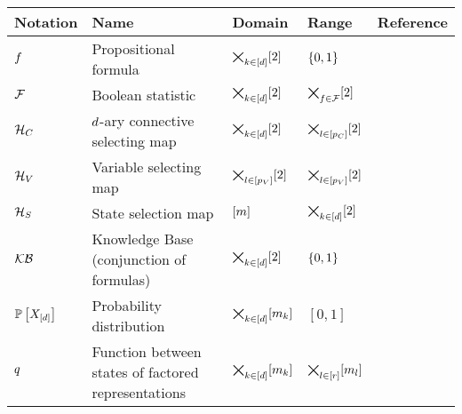 \begin{center}
    \begin{tabular}{|p{\fivecolumnwidth}|p{\threecolumnwidth}|p{\fivecolumnwidth}|p{\fivecolumnwidth}|p{\fivecolumnwidth}|}
        \hline
        \rule{0pt}{\rowheight} \textbf{Notation} & \textbf{Name}                                       & \textbf{Domain}                                             & \textbf{Range}                                              & \textbf{Reference}                   \\
        \hline
        \rule{0pt}{\rowheight} $f$      & Propositional formula                               & $\bigtimes_{k\in[d]}[2]$                                               & $\{0,1\}$                                                    & {def:formulas}                \\
        \rule{0pt}{\rowheight} $\mathcal{F}$        & Boolean statistic                                   & $\bigtimes_{k\in[d]}[2]$                                               & $\bigtimes_{f\in\mathcal{F}}[2]$                                                    & {def:mln}                \\
        \rule{0pt}{\rowheight} $\mathcal{H}_{C}$  & $d$-ary connective selecting map & $\bigtimes_{k\in[d]}[2]$                                               & $\bigtimes_{l\in[p_{C}]}[2]$ & {def:connectiveSelector} \\
        \rule{0pt}{\rowheight} $\mathcal{H}_{V}$  & Variable selecting map                              & $\bigtimes_{l\in[p_{V}]}[2]$ & $\bigtimes_{l\in[p_{V}]}[2]$ & {def:variableSelector} \\ %
        \rule{0pt}{\rowheight} $\mathcal{H}_{S}$  & State selection map                                 & $[m]$                                                 & $\bigtimes_{k\in[d]}[2]$ & {def:stateSelector} \\
        \rule{0pt}{\rowheight} $\mathcal{KB}$             & Knowledge Base (conjunction of formulas)            & $\bigtimes_{k\in[d]}[2]$                                               & $\{0,1\}$                                                    &                                      \\
        \rule{0pt}{\rowheight} $\mathbb{P}\left[X_{[d]}\right]$       & Probability distribution                            & $\bigtimes_{k\in[d]}[m_{k}]$                                                & $[0,1]$                                                     & {def:probabilityDistribution} \\
        \rule{0pt}{\rowheight} $q$     & Function between states of factored representations                   & $\bigtimes_{k\in[d]}[m_{k}]$                                                & $\bigtimes_{l\in[r]}[m_{l}]$                                             &                                      \\
        \hline
    \end{tabular}
\end{center}

